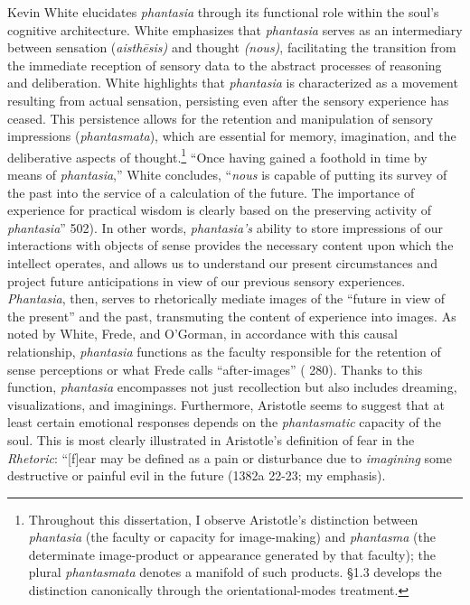 \documentclass{article}
\begin{document}
Kevin White elucidates \textit{phantasia} through its functional role within the soul's cognitive architecture. White emphasizes that \textit{phantasia} serves as an intermediary between sensation (\textit{aisthēsis)} and thought \textit{(nous)}, facilitating the transition from the immediate reception of sensory data to the abstract processes of reasoning and deliberation. White highlights that \textit{phantasia} is characterized as a movement resulting from actual sensation, persisting even after the sensory experience has ceased. This persistence allows for the retention and manipulation of sensory impressions (\textit{phantasmata}), which are essential for memory, imagination, and the deliberative aspects of thought.\footnote{Throughout this dissertation, I observe Aristotle's distinction between \textit{phantasia} (the faculty or capacity for image-making) and \textit{phantasma} (the determinate image-product or appearance generated by that faculty); the plural \textit{phantasmata} denotes a manifold of such products. \S1.3 develops the distinction canonically through the orientational-modes treatment.} ``Once having gained a foothold in time by means of \textit{phantasia},'' White concludes, ``\textit{nous} is capable of putting its survey of the past into the service of a calculation of the future. The importance of experience for practical wisdom is clearly based on the preserving activity of \textit{phantasia}'' \cite{white1985meaning} 502). In other words, \textit{phantasia's} ability to store impressions of our interactions with objects of sense provides the necessary content upon which the intellect operates, and allows us to understand our present circumstances and project future anticipations in view of our previous sensory experiences. \textit{Phantasia}, then, serves to rhetorically mediate images of the “future in view of the present” and the past, transmuting the content of experience into images. As noted by White, Frede, and O'Gorman, in accordance with this causal relationship, \textit{phantasia} functions as the faculty responsible for the retention of sense perceptions or what Frede calls ``after-images'' (\cite{frede1992cognitive} 280). Thanks to this function, \textit{phantasia} encompasses not just recollection but also includes dreaming, visualizations, and imaginings. Furthermore, Aristotle seems to suggest that at least certain emotional responses depends on the \textit{phantasmatic} capacity of the soul. This is most clearly illustrated in Aristotle's definition of fear in the \textit{Rhetoric}: ``[f]ear may be defined as a pain or disturbance due to \textit{imagining} some destructive or painful evil in the future (1382a 22-23; my emphasis). 
\end{document}
